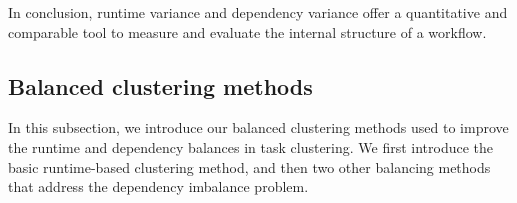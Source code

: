\documentclass[final,5p,times,twocolumn]{elsarticle}
\begin{document}
In conclusion, runtime variance and dependency variance offer a quantitative and comparable tool to measure and evaluate the internal structure of a workflow. 



\subsection{Balanced clustering methods}
\label{sec:methods}
In this subsection, we introduce our balanced clustering methods used to improve the runtime and dependency balances in task clustering. We first introduce the basic runtime-based clustering method, and then two other balancing methods that address the dependency imbalance problem. %


\end{document}
